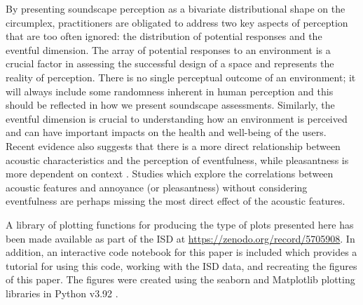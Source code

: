 By presenting soundscape perception as a bivariate distributional shape on the circumplex, practitioners are obligated to address two key aspects of perception that are too often ignored: the distribution of potential responses and the eventful dimension. The array of potential responses to an environment is a crucial factor in assessing the successful design of a space and represents the reality of perception. There is no single perceptual outcome of an environment; it will always include some randomness inherent in human perception and this should be reflected in how we present soundscape assessments. Similarly, the eventful dimension is crucial to understanding how an environment is perceived and can have important impacts on the health and well-being of the users. Recent evidence also suggests that there is a more direct relationship between acoustic characteristics and the perception of eventfulness, while pleasantness is more dependent on context \citep{Mitchell2021Investigating}. Studies which explore the correlations between acoustic features and annoyance (or pleasantness) without considering eventfulness are perhaps missing the most direct effect of the acoustic features.

A library of plotting functions for producing the type of plots presented here has been made available as part of the ISD at \href{https://zenodo.org/record/5705908}{https://zenodo.org/record/5705908}. In addition, an interactive code notebook for this paper is included which provides a tutorial for using this code, working with the ISD data, and recreating the figures of this paper. The figures were created using the seaborn \citep{Waskom2021seaborn} and Matplotlib \citep{Hunter2007Matplotlib} plotting libraries in Python v3.92 \citep{VanRossum2009}.

